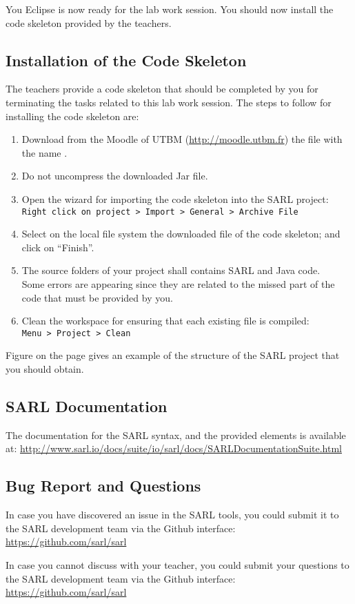 You Eclipse is now ready for the lab work session.
\ifCODESKELETON
You should now install the code skeleton provided by the teachers.

\subsection{Installation of the Code Skeleton}

The teachers provide a code skeleton that should be completed by you for terminating the tasks related to this lab work session.
The steps to follow for installing the code skeleton are:
\begin{enumerate}
\item Download from the Moodle of UTBM (\url{http://moodle.utbm.fr}) the file with the name \skeletonName.
\item Do not uncompress the downloaded Jar file.
\item Open the wizard for importing the code skeleton into the SARL project: \\
	\texttt{Right click on project > Import > General > Archive File}
\item Select on the local file system the downloaded file of the code skeleton; and click on ``Finish''.
\item The source folders of your project shall contains SARL and Java code. \\
	Some errors are appearing since they are related to the missed part of the code that must be provided by you. 
\item Clean the workspace for ensuring that each existing file is compiled: \\
	\texttt{Menu > Project > Clean}
\end{enumerate}

Figure  on the page  gives an example of the structure of the SARL project that you should obtain.

\fi

\subsection{SARL Documentation}

The documentation for the SARL syntax, and the provided elements is available at: \url{http://www.sarl.io/docs/suite/io/sarl/docs/SARLDocumentationSuite.html}

\subsection{Bug Report and Questions}

In case you have discovered an issue in the SARL tools, you could submit it to the SARL development team via the Github interface: \url{https://github.com/sarl/sarl}

In case you cannot discuss with your teacher, you could submit your questions to the SARL development team via the Github interface: \url{https://github.com/sarl/sarl}

